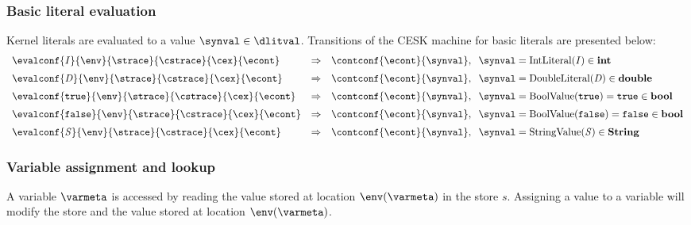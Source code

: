 \documentclass{article}
\begin{document}
\subsubsection{Basic literal evaluation}
\label{subsubsec:basic-literal-eval}
Kernel literals are evaluated to a value $\synval \in \dlitval$. Transitions of the CESK machine for basic literals are presented below:
\[
  \begin{array}{lcll}
	\evalconf{\IntLiteral{\integermeta}}{\env}{\strace}{\cstrace}{\cex}{\econt}
	& \Rightarrow &
	\contconf{\econt}{\synval},
	\hspace{2mm}\synval = \mathrm{IntLiteral(\integermeta)} \in \mathbf{int}\\[2mm]

	\evalconf{\DoubleLiteral{\doublemeta} }{\env}{\strace}{\cstrace}{\cex}{\econt}
	& \Rightarrow &
	\contconf{\econt}{\synval},
	\hspace{2mm}\synval = \mathrm{DoubleLiteral(\doublemeta)} \in \mathbf{double}\\[2mm]

	\evalconf{\BoolLiteral{\tt{true}}}{\env}{\strace}{\cstrace}{\cex}{\econt}
	& \Rightarrow &
	\contconf{\econt}{\synval},
	\hspace{2mm}\synval = \mathrm{BoolValue(\tt{true})} = \tt{true}\in \mathbf{bool}\\[2mm]

	\evalconf{\BoolLiteral{\tt{false}}}{\env}{\strace}{\cstrace}{\cex}{\econt}
	& \Rightarrow &
	\contconf{\econt}{\synval},
	\hspace{2mm}\synval = \mathrm{BoolValue(\tt{false})} = \tt{false}\in \mathbf{bool}\\[2mm]

	\evalconf{\StringLiteral{\stringmeta}}{\env}{\strace}{\cstrace}{\cex}{\econt}
	& \Rightarrow &
	\contconf{\econt}{\synval},
	\hspace{2mm}\synval = \mathrm{StringValue(\stringmeta)} \in \mathbf{String}

  \end{array}
\]

\subsubsection{Variable assignment and lookup}
\label{subsubsec:variable-assignment-and-lookup}
A variable $\varmeta$ is accessed by reading the value stored at location $\env(\varmeta)$ in the store $s$. Assigning a value to a variable will modify the store and the value stored at location  $\env(\varmeta)$.
\end{document}
